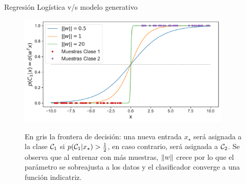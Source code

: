 \documentclass[9pt]{beamer}
\begin{document}
\begin{frame}{Regresión Logística v/s modelo generativo}
\begin{figure}[H]
  \centering
  \includegraphics[width=0.9\textwidth]{../img/cap3_logistica.pdf}\\
  \caption{En gris la frontera de decisión: una nueva entrada $x_\star$ será asignada a la clase ${\mathcal C}_1$ si $p({\mathcal C}_1|x_\star)>\frac{1}{2}$, en caso contrario, será asignada a ${\mathcal C}_2$. Se observa que al entrenar con más muestras, $\left\lVert w\right\rVert$ crece por lo que el parámetro se sobreajusta a los datos y el clasificador converge a una función indicatriz.}
\end{figure}


\end{frame}

\begin{frame}
  \titlepage
\end{frame}



%
\end{document}
